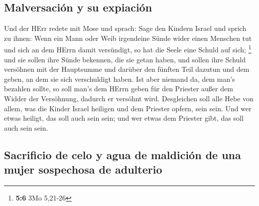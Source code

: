 \hypertarget{malversaciuxf3n-y-su-expiaciuxf3n}{%
\subsection{Malversación y su
expiación}\label{malversaciuxf3n-y-su-expiaciuxf3n}}

 Und der HErr redete mit Mose und sprach: 
Sage den Kindern Israel und sprich zu ihnen: Wenn ein Mann oder Weib
irgendeine Sünde wider einen Menschen tut und sich an dem HErrn damit
versündigt, so hat die Seele eine Schuld auf sich; \footnote{\textbf{5:6}
  3Mo 5,21-26}  und sie sollen ihre Sünde bekennen, die
sie getan haben, und sollen ihre Schuld versöhnen mit der Hauptsumme und
darüber den fünften Teil dazutun und dem geben, an dem sie sich
verschuldigt haben.  Ist aber niemand da, dem man's
bezahlen sollte, so soll man's dem HErrn geben für den Priester außer
dem Widder der Versöhnung, dadurch er versöhnt wird. 
Desgleichen soll alle Hebe von allem, was die Kinder Israel heiligen und
dem Priester opfern, sein sein.  Und wer etwas heiligt,
das soll auch sein sein; und wer etwas dem Priester gibt, das soll auch
sein sein.

\hypertarget{sacrificio-de-celo-y-agua-de-maldiciuxf3n-de-una-mujer-sospechosa-de-adulterio}{%
\subsection{Sacrificio de celo y agua de maldición de una mujer
sospechosa de
adulterio}\label{sacrificio-de-celo-y-agua-de-maldiciuxf3n-de-una-mujer-sospechosa-de-adulterio}}

